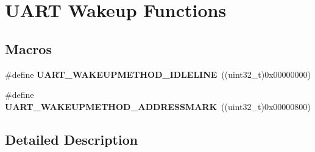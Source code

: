\hypertarget{group___u_a_r_t___wake_up__functions}{}\section{U\+A\+RT Wakeup Functions}
\label{group___u_a_r_t___wake_up__functions}
\subsection*{Macros}
\begin{DoxyCompactItemize}
\item 
\#define {\bfseries U\+A\+R\+T\+\_\+\+W\+A\+K\+E\+U\+P\+M\+E\+T\+H\+O\+D\+\_\+\+I\+D\+L\+E\+L\+I\+NE}~((uint32\+\_\+t)0x00000000)\hypertarget{group___u_a_r_t___wake_up__functions_ga2411ed44c5d82db84c5819e1e2b5b8b3}{}\label{group___u_a_r_t___wake_up__functions_ga2411ed44c5d82db84c5819e1e2b5b8b3}

\item 
\#define {\bfseries U\+A\+R\+T\+\_\+\+W\+A\+K\+E\+U\+P\+M\+E\+T\+H\+O\+D\+\_\+\+A\+D\+D\+R\+E\+S\+S\+M\+A\+RK}~((uint32\+\_\+t)0x00000800)\hypertarget{group___u_a_r_t___wake_up__functions_ga4c6935f26f8f2a9fe70fd6306a9882cb}{}\label{group___u_a_r_t___wake_up__functions_ga4c6935f26f8f2a9fe70fd6306a9882cb}

\end{DoxyCompactItemize}


\subsection{Detailed Description}

